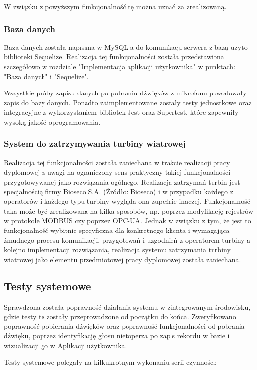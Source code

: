 \documentclass{sprz}
\begin{document}
W związku z powyższym funkcjonalność tę można uznać za zrealizowaną.

\subsubsection{Baza danych}
Baza danych została napisana w MySQL a do komunikacji serwera z bazą użyto biblioteki Sequelize. Realizacja tej funkcjonalności została przedstawiona szczegółowo w rozdziale "Implementacja aplikacji użytkownika" w punktach: "Baza danych" i "Sequelize". 

Wszystkie próby zapisu danych po pobraniu dźwięków z mikrofonu powodowały zapis do bazy danych. Ponadto zaimplementowane zostały testy jednostkowe oraz integracyjne z wykorzystaniem bibliotek Jest oraz Supertest, które zapewniły wysoką jakość oprogramowania.

\subsubsection{System do zatrzymywania turbiny wiatrowej}
Realizacja tej funkcjonalności została zaniechana w trakcie realizacji pracy dyplomowej z uwagi na ograniczony sens praktyczny takiej funkcjonalności przygotowywanej jako rozwiązania ogólnego. Realizacja zatrzymań turbin jest specjalnością firmy Bioseco S.A. (Źródło: Bioseco) i w przypadku każdego z operatorów i każdego typu turbiny wygląda ona zupełnie inaczej. Funkcjonalność taka może być zrealizowana na kilka sposobów, np. poprzez modyfikację rejestrów w protokole MODBUS czy poprzez OPC-UA. Jednak w związku z tym, że jest to funkcjonalność wybitnie specyficzna dla konkretnego klienta i wymagająca żmudnego procesu komunikacji, przygotowań i uzgodnień z operatorem turbiny a kolejno implementacji rozwiązania, realizacja systemu zatrzymania turbiny wiatrowej jako elementu przedmiotowej pracy dyplomowej została zaniechana.


\subsection{Testy systemowe}
Sprawdzona została poprawność działania systemu w zintegrowanym środowisku, gdzie testy te zostały przeprowadzone od początku do końca. Zweryfikowano poprawność pobierania dźwięków oraz poprawność funkcjonalności od pobrania dźwięku, poprzez identyfikację głosu nietoperza po zapis rekordu w bazie i wizualizacji go w Aplikacji użytkownika.

Testy systemowe polegały na kilkukrotnym wykonaniu serii czynności:
\end{document}
